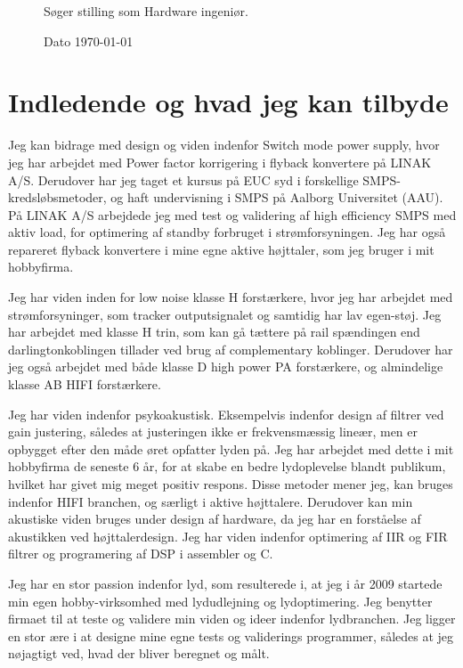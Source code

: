 \documentclass{my_application}
\begin{document}
%
\firstpagestyle{}
%
\begin{figure}[!ht]
\begin{minipage}[t][1 pt]{.69\textwidth}%
	\Large{Søger stilling som Hardware ingeniør.}
\end{minipage}
\hfill%
\begin{minipage}[t][1 pt][b]{.29\textwidth}
	\vfill
	\hfill Dato \today
\end{minipage}%
\end{figure}
%
\section{Indledende og hvad jeg kan tilbyde}
Jeg kan bidrage med design og viden indenfor Switch mode power supply, hvor jeg har arbejdet med Power factor korrigering i flyback konvertere på LINAK A/S. Derudover har jeg taget et kursus på EUC syd i forskellige SMPS-kredsløbsmetoder, og haft undervisning i SMPS på Aalborg Universitet (AAU). På LINAK A/S arbejdede jeg med test og validering af high efficiency SMPS med aktiv load, for optimering af standby forbruget i strømforsyningen. Jeg har også repareret flyback konvertere i mine egne aktive højttaler, som jeg bruger i mit hobbyfirma.

Jeg har viden inden for low noise klasse H forstærkere, hvor jeg har arbejdet med strømforsyninger, som tracker outputsignalet og samtidig har lav egen-støj. Jeg har arbejdet med klasse H trin, som kan gå tættere på rail spændingen end darlingtonkoblingen tillader ved brug af complementary koblinger. Derudover har jeg også arbejdet med både klasse D high power PA forstærkere, og almindelige klasse AB HIFI forstærkere.

Jeg har viden indenfor psykoakustisk. Eksempelvis indenfor design af filtrer ved gain justering, således at justeringen ikke er frekvensmæssig lineær, men er opbygget efter den måde øret opfatter lyden på. Jeg har arbejdet med dette i mit hobbyfirma de seneste 6 år, for at skabe en bedre lydoplevelse blandt publikum, hvilket har givet mig meget positiv respons. Disse metoder mener jeg, kan bruges indenfor HIFI branchen, og særligt i aktive højttalere. Derudover kan min akustiske viden bruges under design af hardware, da jeg har en forståelse af akustikken ved højttalerdesign. Jeg har viden indenfor optimering af IIR og FIR filtrer og programering af DSP i assembler og C. 

Jeg har en stor passion indenfor lyd, som resulterede i, at jeg i år 2009 startede min egen hobby-virksomhed med lydudlejning og lydoptimering. Jeg benytter firmaet til at teste og validere min viden og ideer indenfor lydbranchen. Jeg ligger en stor ære i at designe mine egne tests og validerings programmer, således at jeg nøjagtigt ved, hvad der bliver beregnet og målt. 
\end{document}

